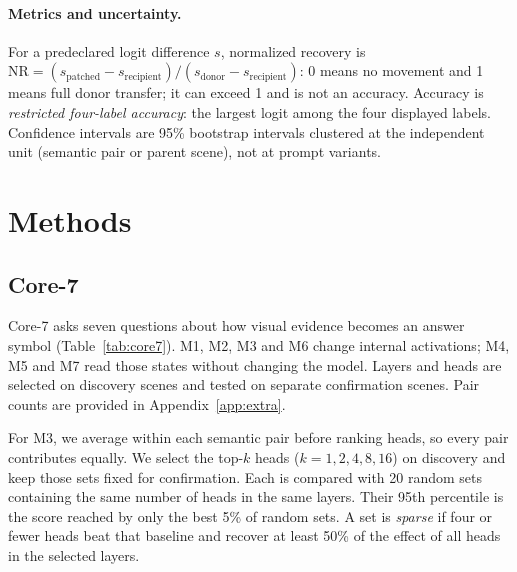 \documentclass[11pt]{article}
\newcommand{\nr}{\mathrm{NR}}
\begin{document}
\paragraph{Metrics and uncertainty.} For a predeclared logit difference $s$, normalized recovery is $\nr=(s_{\mathrm{patched}}-s_{\mathrm{recipient}})/(s_{\mathrm{donor}}-s_{\mathrm{recipient}})$: 0 means no movement and 1 means full donor transfer; it can exceed 1 and is not an accuracy. Accuracy is \emph{restricted four-label accuracy}: the largest logit among the four displayed labels. Confidence intervals are 95\% bootstrap intervals clustered at the independent unit (semantic pair or parent scene), not at prompt variants.



\section{Methods}

\subsection{Core-7}

Core-7 asks seven questions about how visual evidence becomes an answer symbol (Table~\ref{tab:core7}). M1, M2, M3 and M6 change internal activations; M4, M5 and M7 read those states without changing the model. Layers and heads are selected on discovery scenes and tested on separate confirmation scenes. Pair counts are provided in Appendix~\ref{app:extra}.

For M3, we average within each semantic pair before ranking heads, so every pair contributes equally. We select the top-$k$ heads ($k=1,2,4,8,16$) on discovery and keep those sets fixed for confirmation. Each is compared with 20 random sets containing the same number of heads in the same layers. Their 95th percentile is the score reached by only the best 5\% of random sets. A set is \emph{sparse} if four or fewer heads beat that baseline and recover at least 50\% of the effect of all heads in the selected layers.
\end{document}
